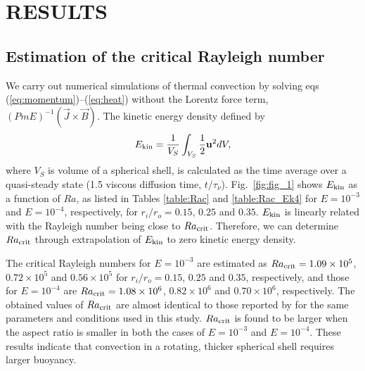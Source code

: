 \section{RESULTS}

\subsection{Estimation of the critical Rayleigh number}

We carry out numerical simulations of thermal convection by solving eqs (\ref{eq:momentum})--(\ref{eq:heat}) without the Lorentz force term, $\left(Pm E\right)^{-1} \left(\vec{J} \times \vec{B} \right)$.
The kinetic energy density defined by
%
\begin{equation}
E_{\rm kin} = \frac{1}{V_{S}} \int_{V_{S}} \frac{1}{2} \vec{u}^{2} dV,
\label{eq:kinetic_energy}
\end{equation}
%
where $V_{S}$ is volume of a spherical shell, is calculated as the time average over a quasi-steady state (1.5 viscous diffusion time, $t/\tau_\nu$).
Fig.~\ref{fig:fig_1} shows $E_{\rm kin}$ as a function of $Ra$, as listed in Tables \ref{table:Rac} and \ref{table:Rac_Ek4} for $E = 10^{-3}$ and $E = 10^{-4}$, respectively, for $r_i / r_o = 0.15$, $0.25$ and $0.35$.
$E_{\rm kin}$ is linearly related with the Rayleigh number being close to $Ra_{\rm crit}$.
Therefore, we can determine $Ra_{\rm crit}$ through extrapolation of $E_{\rm kin}$ to zero kinetic energy density.
%



%
The critical Rayleigh numbers for $E = 10^{-3}$ are estimated as $Ra_{\rm crit} = 1.09 \times 10^5$, $0.72 \times 10^5$ and $0.56 \times 10^5$ for $r_i/r_o = 0.15$, $0.25$ and $0.35$, respectively, and those for $E = 10^{-4}$ are $Ra_{\rm crit} = 1.08 \times 10^6$, $0.82 \times 10^6$ and $0.70 \times 10^6$, respectively.
%
The obtained values of $Ra_{\rm crit}$ are almost identical to those reported by \citet{AlShamali:2004} for the same parameters and conditions used in this study. 
%
$Ra_{\rm crit}$ is found to be larger when the aspect ratio is smaller in both the cases of $E = 10^{-3}$ and $E = 10^{-4}$. 
These results indicate that convection in a rotating, thicker spherical shell requires larger buoyancy.
%

